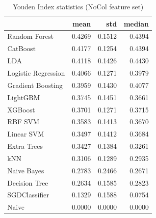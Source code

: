 \begin{table}
\caption{Youden Index statistics (NoCol feature set)}
\label{tab:youden_NoCol_stats}
\begin{tabular}{lrrr}
\toprule
 & mean & std & median \\
\midrule
Random Forest & 0.4269 & 0.1512 & 0.4394 \\
CatBoost & 0.4177 & 0.1254 & 0.4394 \\
LDA & 0.4118 & 0.1426 & 0.4430 \\
Logistic Regression & 0.4066 & 0.1271 & 0.3979 \\
Gradient Boosting & 0.3959 & 0.1430 & 0.4077 \\
LightGBM & 0.3745 & 0.1451 & 0.3661 \\
XGBoost & 0.3701 & 0.1271 & 0.3715 \\
RBF SVM & 0.3583 & 0.1413 & 0.3670 \\
Linear SVM & 0.3497 & 0.1412 & 0.3684 \\
Extra Trees & 0.3427 & 0.1384 & 0.3261 \\
kNN & 0.3106 & 0.1289 & 0.2935 \\
Naive Bayes & 0.2783 & 0.2466 & 0.2671 \\
Decision Tree & 0.2634 & 0.1585 & 0.2823 \\
SGDClassifier & 0.1329 & 0.1588 & 0.0754 \\
Naive & 0.0000 & 0.0000 & 0.0000 \\
\bottomrule
\end{tabular}
\end{table}
